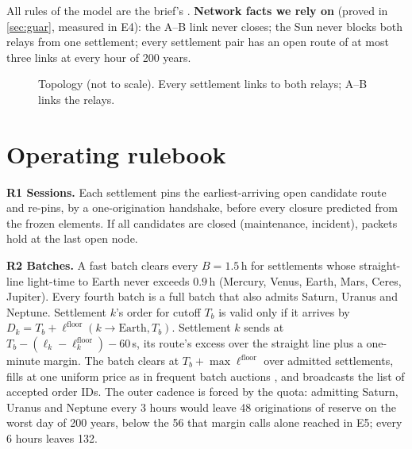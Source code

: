 \documentclass[11pt]{article}
\theoremstyle{definition}
\theoremstyle{remark}
\newcommand{\h}{\,\mathrm{h}}
\newcommand{\lfl}{\ell^{\mathrm{floor}}}
\begin{document}
All rules of the model are the brief's \cite{brief}. \textbf{Network facts we rely on} (proved in \cref{sec:guar}, measured in E4): the A--B link never closes; the Sun never blocks both relays from one settlement; every settlement pair has an open route of at most three links at every hour of 200 years.
\begin{figure}[H]
\centering
{}
\caption{Topology (not to scale). Every settlement links to both relays; A--B links the relays.}
\end{figure}
\vspace{-8pt}
\section{Operating rulebook}\label{sec:rules}
\textbf{R1 Sessions.} Each settlement pins the earliest-arriving open candidate route and re-pins, by a one-origination handshake, before every closure predicted from the frozen elements. If all candidates are closed (maintenance, incident), packets hold at the last open node.

\textbf{R2 Batches.} A fast batch clears every $B=1.5\h$ for settlements whose straight-line light-time to Earth never exceeds $0.9\h$ (Mercury, Venus, Earth, Mars, Ceres, Jupiter). Every fourth batch is a full batch that also admits Saturn, Uranus and Neptune. Settlement $k$'s order for cutoff $T_b$ is valid only if it arrives by $D_k = T_b + \lfl(k\to\text{Earth},T_b)$. Settlement $k$ sends at $T_b - (\ell_k - \lfl_k) - 60\,$s, its route's excess over the straight line plus a one-minute margin. The batch clears at $T_b+\max\lfl$ over admitted settlements, fills at one uniform price as in frequent batch auctions \cite{budish2015}, and broadcasts the list of accepted order IDs. The outer cadence is forced by the quota: admitting Saturn, Uranus and Neptune every 3 hours would leave 48 originations of reserve on the worst day of 200 years, below the 56 that margin calls alone reached in E5; every 6 hours leaves 132.
\end{document}

